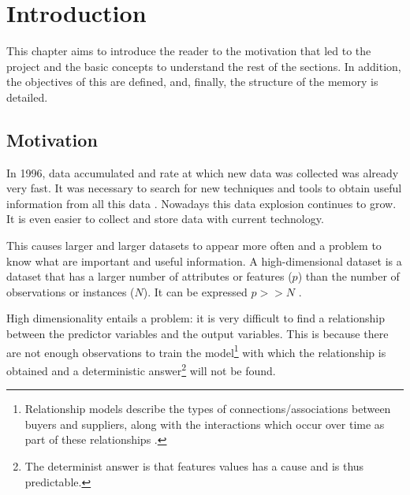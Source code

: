 \chapter{Introduction}
\label{cha:introduction}

This chapter aims to introduce the reader to the motivation that led to the project and the basic concepts to understand the rest of the sections. In addition, the objectives of this are defined, and, finally, the structure of the memory is detailed.

\section{Motivation}
\label{sec:motivation}

In 1996, data accumulated and rate at which new data was collected was already very fast. It was necessary to search for new techniques and tools to obtain useful information from all this data \cite{Fayyad96b}. Nowadays this data explosion continues to grow. It is even easier to collect and store data with current technology.

This causes larger and larger datasets to appear more often and a problem to know what are important and useful information. A high-dimensional dataset is a dataset that has a larger number of attributes or features ($p$) than the number of observations or instances ($N$). It can be expressed $p >> N$ \cite{high-dimensionality}.

High dimensionality entails a problem: it is very difficult to find a relationship between the predictor variables and the output variables. This is because there are not enough observations to train the model\footnote{Relationship models describe the types of connections/associations between buyers and suppliers, along with the interactions which occur over time as part of these relationships \cite{carr1999strategically}.} with which the relationship is obtained and a deterministic answer\footnote{The determinist answer is that features values has a cause and is thus predictable.} will not be found.


